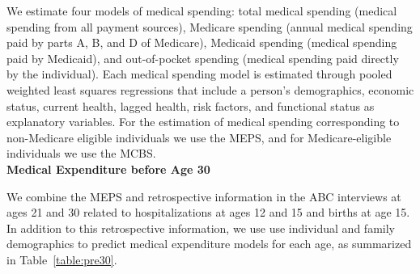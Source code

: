 \noindent We estimate four models of medical spending: total medical spending (medical spending from all payment sources), Medicare spending (annual medical spending paid by parts A, B, and D of Medicare), Medicaid spending (medical spending paid by Medicaid), and out-of-pocket spending (medical spending paid directly by the individual). Each medical spending model is estimated through pooled weighted least squares regressions that include a person's demographics, economic status, current health, lagged health, risk factors, and functional status as explanatory variables. For the estimation of medical spending corresponding to non-Medicare eligible individuals we use the MEPS, and for Medicare-eligible individuals we use the MCBS.\\ 

\noindent \textbf{Medical Expenditure before Age 30}

\noindent We combine the MEPS and retrospective information in the ABC interviews at ages 21 and 30 related to hospitalizations at ages 12 and 15 and births at age 15. In addition to this retrospective information, we use use individual and family demographics to predict medical expenditure models for each age, as summarized in Table~\ref{table:pre30}.\\

